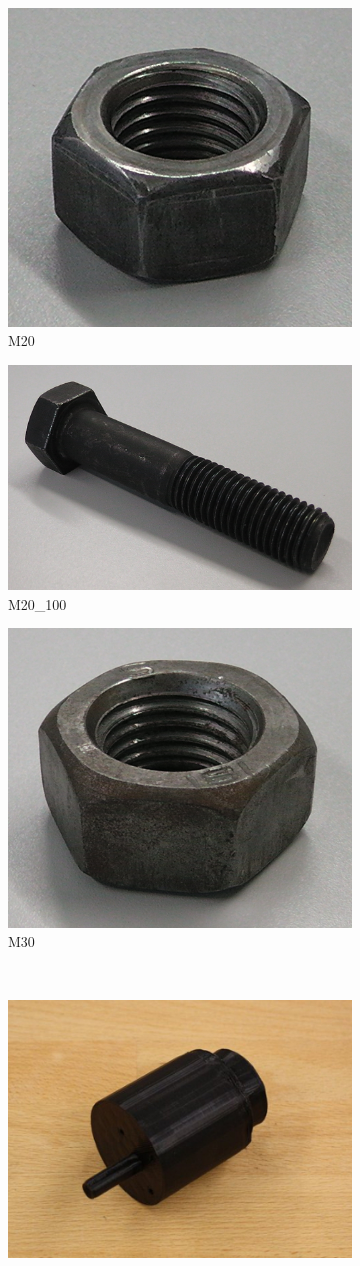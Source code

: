 \begin{figure}
\begin{subfigure}{.3\textwidth}
  			\includegraphics[width=.5\linewidth]{images/M20}
 			 \caption{M20 \cite{github_robocup@work}}
  			\label{fig:M20}
		\end{subfigure}
		\begin{subfigure}{.3\textwidth}
 			 \centering
  			\includegraphics[width=.5\linewidth]{images/M20_100}
  			\caption{M20\_100 \cite{github_robocup@work}}
  			\label{fig:M20_100}
		\end{subfigure}
		\begin{subfigure}{.3\textwidth}
  			\centering
  			\includegraphics[width=.5\linewidth]{images/M30}
  			\caption{M30 \cite{github_robocup@work}}
  			\label{fig:M30}
		\end{subfigure}\\
		\vspace{3mm}
		\begin{subfigure}{.3\textwidth}
  			\centering
  			\includegraphics[width=.5\linewidth]{images/motor}

\end{subfigure}
\end{figure}
